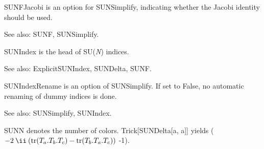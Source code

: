 
SUNFJacobi is an option for SUNSimplify, indicating whether the Jacobi identity should be used.

See also: { }SUNF, SUNSimplify.








SUNIndex is the head of SU({\itshape N}) indices.

See also: ExplicitSUNIndex, SUNDelta, SUNF.










SUNIndexRename is an option of SUNSimplify. If set to False, no automatic renaming of dummy indices is done.

See also:  SUNSimplify, SUNIndex.



SUNN denotes the number of colors. Trick[SUNDelta[a, a]] yields (\(-2\multsp \ImaginaryI \multsp (\Muserfunction{tr}({T_a}.{T_b}.{T_c})-\Muserfunction{tr}({T_b}.{T_a}.{T_c}))\)
-1).

